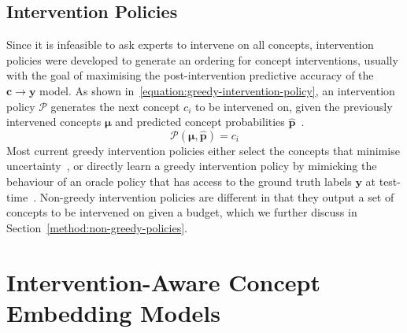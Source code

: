 \subsection{Intervention Policies}
Since it is infeasible to ask experts to intervene on all concepts,
intervention policies were developed to 
generate an ordering for concept interventions,
usually with the goal of maximising the post-intervention 
predictive accuracy of the $\mathbf{c} \to \mathbf{y}$ model. 
As shown in~\ref{equation:greedy-intervention-policy},
an intervention policy $\mathcal{P}$ generates the next concept $c_i$ to be intervened on, given the previously
intervened concepts $\bm{\mu}$ and 
predicted concept probabilities $\hat{\mathbf{p}}$~\cite{ectp, coop, intervention-policies}.
\begin{equation}\label{equation:greedy-intervention-policy}
\mathcal{P}(\bm{\mu}, \hat{\mathbf{p}}) =c_i
\end{equation}
Most current greedy intervention policies
either select the concepts that 
minimise uncertainty~\cite{coop, ectp}, 
or directly learn a greedy 
intervention policy
by mimicking the behaviour of an oracle
policy that has access to the ground truth labels $\mathbf{y}$ at test-time~\cite{behavioural-cloning, intcem}.
Non-greedy intervention policies
are different in that they output a set of concepts to be intervened on given a budget,
which we further discuss in Section~\ref{method:non-greedy-policies}.



\section{Intervention-Aware Concept Embedding Models} %

